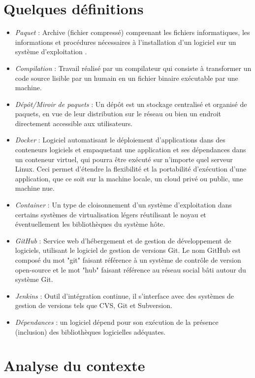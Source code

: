 \documentclass[12pt,a4paper]{article}
\begin{document}
\section*{Quelques définitions}
	\begin{itemize}\renewcommand{\labelitemi}{$\bullet$}
		\item \textit{Paquet} : Archive (fichier compressé) comprenant les fichiers informatiques, les informations et procédures nécessaires à l'installation d'un logiciel sur un système d'exploitation .
		\item \textit{Compilation} : Travail réalisé par un compilateur qui consiste à transformer un code source lisible par un humain en un fichier binaire exécutable par une machine.
		\item \textit{Dépôt/Miroir de paquets} : Un dépôt est un stockage centralisé et organisé de paquets, en vue de leur distribution sur le réseau ou bien un endroit directement accessible aux utilisateurs.
		\item \textit{Docker} : Logiciel automatisant le déploiement d'applications dans des conteneurs logiciels et empaquetant une application et ses dépendances dans un conteneur virtuel, qui pourra être exécuté sur n'importe quel serveur Linux. Ceci permet d'étendre la flexibilité et la portabilité d’exécution d'une application, que ce soit sur la machine locale, un cloud privé ou public, une machine nue. 
		\item \textit{Container} : Un type de cloisonnement d'un système d'exploitation dans certains systèmes de virtualisation légers réutilisant le noyau et éventuellement les bibliothèques du système hôte.
		\item \textit{GitHub} : Service web d'hébergement et de gestion de développement de logiciels, utilisant le logiciel de gestion de versions Git. Le nom GitHub est composé du mot "git" faisant référence à un système de contrôle de version open-source et le mot "hub" faisant référence au réseau social bâti autour du système Git.
		\item \textit{Jenkins} : Outil d'intégration continue,  il s'interface avec des systèmes de gestion de versions tels que CVS, Git et Subversion.
		\item \textit{Dépendances} : un logiciel dépend pour son exécution de la présence (inclusion) des bibliothèques logicielles adéquates.
\end{itemize}


\section{Analyse du contexte}
\end{document}
